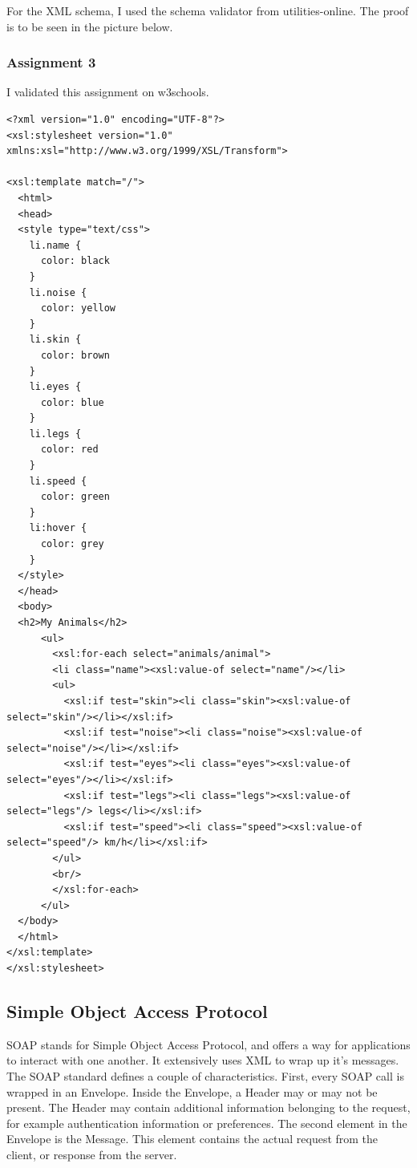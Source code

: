 For the XML schema, I used the schema validator from utilities-online. The proof is to be seen in the picture below.

\subsubsection{Assignment 3}
I validated this assignment on w3schools.

\begin{verbatim}
<?xml version="1.0" encoding="UTF-8"?>
<xsl:stylesheet version="1.0" xmlns:xsl="http://www.w3.org/1999/XSL/Transform">

<xsl:template match="/">
  <html>
  <head>
  <style type="text/css">
    li.name {
      color: black
    }
    li.noise {
      color: yellow
    }
    li.skin {
      color: brown
    }
    li.eyes {
      color: blue
    }
    li.legs {
      color: red
    }
    li.speed {
      color: green
    }
    li:hover {
      color: grey
    }
  </style>
  </head>
  <body>
  <h2>My Animals</h2>
      <ul>
        <xsl:for-each select="animals/animal">
        <li class="name"><xsl:value-of select="name"/></li>
        <ul>
          <xsl:if test="skin"><li class="skin"><xsl:value-of select="skin"/></li></xsl:if>
          <xsl:if test="noise"><li class="noise"><xsl:value-of select="noise"/></li></xsl:if>
          <xsl:if test="eyes"><li class="eyes"><xsl:value-of select="eyes"/></li></xsl:if>
          <xsl:if test="legs"><li class="legs"><xsl:value-of select="legs"/> legs</li></xsl:if>
          <xsl:if test="speed"><li class="speed"><xsl:value-of select="speed"/> km/h</li></xsl:if>
        </ul>
        <br/>
        </xsl:for-each>
      </ul>
  </body>
  </html>
</xsl:template>
</xsl:stylesheet>
\end{verbatim}

\subsection{Simple Object Access Protocol}\label{subsection:soap}
SOAP stands for Simple Object Access Protocol, and offers a way for applications to interact with one another. It extensively uses XML to wrap up it's messages. The SOAP standard defines a couple of characteristics. First, every SOAP call is wrapped in an Envelope. Inside the Envelope, a Header may or may not be present. The Header may contain additional information belonging to the request, for example authentication information or preferences. The second element in the Envelope is the Message. This element contains the actual request from the client, or response from the server.

